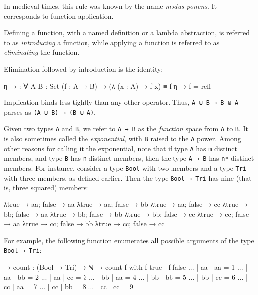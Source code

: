 In medieval times, this rule was known by the name \emph{modus ponens}.
It corresponds to function application.

Defining a function, with a named definition or a lambda abstraction, is
referred to as \emph{introducing} a function, while applying a function
is referred to as \emph{eliminating} the function.

Elimination followed by introduction is the identity:

\begin{fence}
\begin{code}
η-→ : ∀ {A B : Set} (f : A → B) → (λ (x : A) → f x) ≡ f
η-→ f = refl
\end{code}
\end{fence}

Implication binds less tightly than any other operator. Thus,
\texttt{A\ ⊎\ B\ →\ B\ ⊎\ A} parses as \texttt{(A\ ⊎\ B)\ →\ (B\ ⊎\ A)}.

Given two types \texttt{A} and \texttt{B}, we refer to \texttt{A\ →\ B}
as the \emph{function} space from \texttt{A} to \texttt{B}. It is also
sometimes called the \emph{exponential}, with \texttt{B} raised to the
\texttt{A} power. Among other reasons for calling it the exponential,
note that if type \texttt{A} has \texttt{m} distinct members, and type
\texttt{B} has \texttt{n} distinct members, then the type
\texttt{A\ →\ B} has \texttt{nᵐ} distinct members. For instance,
consider a type \texttt{Bool} with two members and a type \texttt{Tri}
with three members, as defined earlier. Then the type
\texttt{Bool\ →\ Tri} has nine (that is, three squared) members:

\begin{myDisplay}
λ{true → aa; false → aa}  λ{true → aa; false → bb}  λ{true → aa; false → cc}
λ{true → bb; false → aa}  λ{true → bb; false → bb}  λ{true → bb; false → cc}
λ{true → cc; false → aa}  λ{true → cc; false → bb}  λ{true → cc; false → cc}
\end{myDisplay}

For example, the following function enumerates all possible arguments of
the type \texttt{Bool\ →\ Tri}:

\begin{fence}
\begin{code}
→-count : (Bool → Tri) → ℕ
→-count f with f true | f false
...          | aa     | aa      =   1
...          | aa     | bb      =   2
...          | aa     | cc      =   3
...          | bb     | aa      =   4
...          | bb     | bb      =   5
...          | bb     | cc      =   6
...          | cc     | aa      =   7
...          | cc     | bb      =   8
...          | cc     | cc      =   9
\end{code}
\end{fence}

